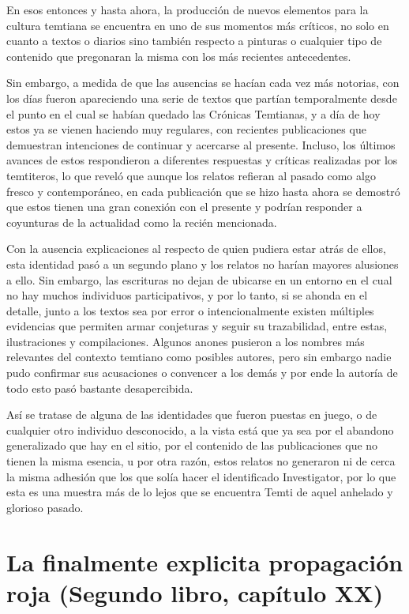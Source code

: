 \documentclass[
  spanish,
]{book}
\begin{document}
En esos entonces y hasta ahora, la producción de nuevos elementos para la cultura temtiana se encuentra en uno de sus momentos más críticos, no solo en cuanto a textos o diarios sino también respecto a pinturas o cualquier tipo de contenido que pregonaran la misma con los más recientes antecedentes.

Sin embargo, a medida de que las ausencias se hacían cada vez más notorias, con los días fueron apareciendo una serie de textos que partían temporalmente desde el punto en el cual se habían quedado las Crónicas Temtianas, y a día de hoy estos ya se vienen haciendo muy regulares, con recientes publicaciones que demuestran intenciones de continuar y acercarse al presente. Incluso, los últimos avances de estos respondieron a diferentes respuestas y críticas realizadas por los temtiteros, lo que reveló que aunque los relatos refieran al pasado como algo fresco y contemporáneo, en cada publicación que se hizo hasta ahora se demostró que estos tienen una gran conexión con el presente y podrían responder a coyunturas de la actualidad como la recién mencionada.

Con la ausencia explicaciones al respecto de quien pudiera estar atrás de ellos, esta identidad pasó a un segundo plano y los relatos no harían mayores alusiones a ello. Sin embargo, las escrituras no dejan de ubicarse en un entorno en el cual no hay muchos individuos participativos, y por lo tanto, si se ahonda en el detalle, junto a los textos sea por error o intencionalmente existen múltiples evidencias que permiten armar conjeturas y seguir su trazabilidad, entre estas, ilustraciones y compilaciones. Algunos anones pusieron a los nombres más relevantes del contexto temtiano como posibles autores, pero sin embargo nadie pudo confirmar sus acusaciones o convencer a los demás y por ende la autoría de todo esto pasó bastante desapercibida.

Así se tratase de alguna de las identidades que fueron puestas en juego, o de cualquier otro individuo desconocido, a la vista está que ya sea por el abandono generalizado que hay en el sitio, por el contenido de las publicaciones que no tienen la misma esencia, u por otra razón, estos relatos no generaron ni de cerca la misma adhesión que los que solía hacer el identificado Investigator, por lo que esta es una muestra más de lo lejos que se encuentra Temti de aquel anhelado y glorioso pasado.

\hypertarget{la-finalmente-explicita-propagaciuxf3n-roja-segundo-libro-capuxedtulo-xx}{%
\section{La finalmente explicita propagación roja (Segundo libro, capítulo XX)}\label{la-finalmente-explicita-propagaciuxf3n-roja-segundo-libro-capuxedtulo-xx}}
\end{document}
